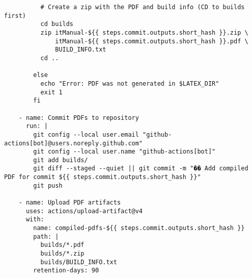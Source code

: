 \begin{verbatim}
          # Create a zip with the PDF and build info (CD to builds first)
          cd builds
          zip itManual-${{ steps.commit.outputs.short_hash }}.zip \
              itManual-${{ steps.commit.outputs.short_hash }}.pdf \
              BUILD_INFO.txt
          cd ..
          
        else
          echo "Error: PDF was not generated in $LATEX_DIR"
          exit 1
        fi 
    
    - name: Commit PDFs to repository
      run: |
        git config --local user.email "github-actions[bot]@users.noreply.github.com"
        git config --local user.name "github-actions[bot]"
        git add builds/
        git diff --staged --quiet || git commit -m "�� Add compiled PDF for commit ${{ steps.commit.outputs.short_hash }}"
        git push
    
    - name: Upload PDF artifacts
      uses: actions/upload-artifact@v4
      with:
        name: compiled-pdfs-${{ steps.commit.outputs.short_hash }}
        path: |
          builds/*.pdf
          builds/*.zip
          builds/BUILD_INFO.txt
        retention-days: 90
\end{verbatim}